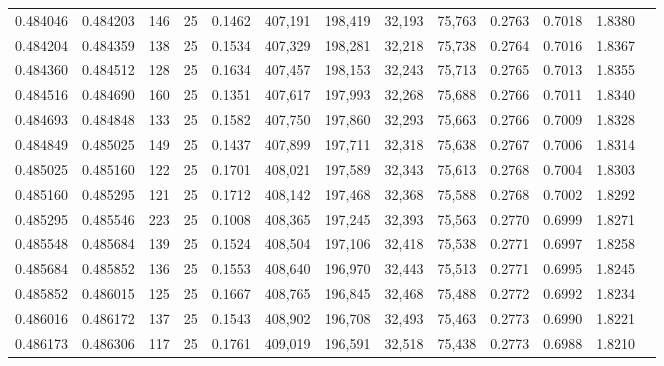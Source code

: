\begin{tabular}{rrrrrrrrrrrrr}
0.484046 & 0.484203 &   146 &  25 &                                     0.1462 & 407,191 & 198,419 &  32,193 &  75,763 & 0.2763 & 0.7018 & 1.8380 \\
0.484204 & 0.484359 &   138 &  25 &                                     0.1534 & 407,329 & 198,281 &  32,218 &  75,738 & 0.2764 & 0.7016 & 1.8367 \\
0.484360 & 0.484512 &   128 &  25 &                                     0.1634 & 407,457 & 198,153 &  32,243 &  75,713 & 0.2765 & 0.7013 & 1.8355 \\
0.484516 & 0.484690 &   160 &  25 &                                     0.1351 & 407,617 & 197,993 &  32,268 &  75,688 & 0.2766 & 0.7011 & 1.8340 \\
0.484693 & 0.484848 &   133 &  25 &                                     0.1582 & 407,750 & 197,860 &  32,293 &  75,663 & 0.2766 & 0.7009 & 1.8328 \\
0.484849 & 0.485025 &   149 &  25 &                                     0.1437 & 407,899 & 197,711 &  32,318 &  75,638 & 0.2767 & 0.7006 & 1.8314 \\
0.485025 & 0.485160 &   122 &  25 &                                     0.1701 & 408,021 & 197,589 &  32,343 &  75,613 & 0.2768 & 0.7004 & 1.8303 \\
0.485160 & 0.485295 &   121 &  25 &                                     0.1712 & 408,142 & 197,468 &  32,368 &  75,588 & 0.2768 & 0.7002 & 1.8292 \\
0.485295 & 0.485546 &   223 &  25 &                                     0.1008 & 408,365 & 197,245 &  32,393 &  75,563 & 0.2770 & 0.6999 & 1.8271 \\
0.485548 & 0.485684 &   139 &  25 &                                     0.1524 & 408,504 & 197,106 &  32,418 &  75,538 & 0.2771 & 0.6997 & 1.8258 \\
0.485684 & 0.485852 &   136 &  25 &                                     0.1553 & 408,640 & 196,970 &  32,443 &  75,513 & 0.2771 & 0.6995 & 1.8245 \\
0.485852 & 0.486015 &   125 &  25 &                                     0.1667 & 408,765 & 196,845 &  32,468 &  75,488 & 0.2772 & 0.6992 & 1.8234 \\
0.486016 & 0.486172 &   137 &  25 &                                     0.1543 & 408,902 & 196,708 &  32,493 &  75,463 & 0.2773 & 0.6990 & 1.8221 \\
0.486173 & 0.486306 &   117 &  25 &                                     0.1761 & 409,019 & 196,591 &  32,518 &  75,438 & 0.2773 & 0.6988 & 1.8210 \\

\end{tabular}
